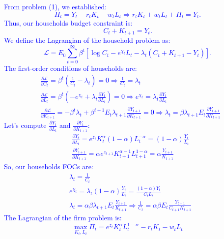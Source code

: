 \begin{solution}
    \textcolor{blue}{
        From problem (1), we established:
        \[ 
        \Pi_t = Y_t - r_t K_t - w_t L_t \Rightarrow r_t K_t + w_t L_t + \Pi_t = Y_t.
        \]
        Thus, our households budget constraint is:
        \[
        C_t + K_{t+1} = Y_t.
        \]
        We define the Lagrangian of the household problem as:
        \[
        \mathcal{L} = E_0 \sum_{t=0}^\infty \beta^t \left[\log C_t - e^{\chi_t} L_t - \lambda_t (C_t + K_{t+1} - Y_t)\right].
        \]
        The first-order conditions of households are:
        \begin{align*}
            & \frac{\partial \mathcal{L}}{\partial C_t} = \beta^t (\frac{1}{C_t} - \lambda_t) = 0 \Rightarrow \frac{1}{C_t} = \lambda_t \\
            & \frac{\partial \mathcal{L}}{\partial L_t} = \beta^t (-e^{\chi_t} + \lambda_t \frac{\partial Y_t}{\partial L_t}) = 0 \Rightarrow e^{\chi_t} = \lambda_t \frac{\partial Y_t}{\partial L_t}\\
            & \frac{\partial \mathcal{L}}{\partial K_{t+1}} = -\beta^t \lambda 
            _t + \beta^{t+1}E_t \lambda_{t+1} \frac{\partial Y_{t+1}}{\partial K_{t+1} } = 0 \Rightarrow \lambda_t = \beta \lambda_{t+1} E_t \frac{\partial Y_{t+1} }{\partial K_{t+1} }
        \end{align*}
        Let's compute $\frac{\partial Y_t}{\partial L_t}$ and $\frac{\partial Y_t}{\partial K_{t+1} }$:
        \begin{align*}
            & \frac{\partial Y_t}{\partial L_t} = e^{z_t} K_t^\alpha (1-\alpha) L_t^{-\alpha} = (1-\alpha) \frac{Y_t}{L_t} \\
            & \frac{\partial Y_{t+1} }{\partial K_{t+1} } = \alpha e^{z_{t+1} } K_{t+1}^{\alpha-1} L_{t+1}^{1-\alpha} = \alpha \frac{Y_{t+1} }{K_{t+1} }
        \end{align*}
        So, our households FOCs are:
        \begin{align}
            & \lambda_t = \frac{1}{C_t}\label{1.1} \\
            & e^{\chi_t} = \lambda_t (1-\alpha ) \frac{Y_t}{L_t} = \frac{(1-\alpha )Y_t}{C_t L_t}\label{1.2} \\
            & \lambda_t = \alpha \beta \lambda_{t+1} E_t \frac{Y_{t+1} }{K_{t+1} } \Rightarrow \frac{1}{C_t} = \alpha \beta E_t \frac{Y_{t+1} }{C_{t+1} K_{t+1} }\label{1.3}
        \end{align}
        The Lagrangian of the firm problem is:
        \[
        \max_{K_t, L_t} \Pi_t = e^{z_t} K_t^\alpha L_t^{1-\alpha} - r_t K_t - w_t L_t
\]}
\end{solution}
